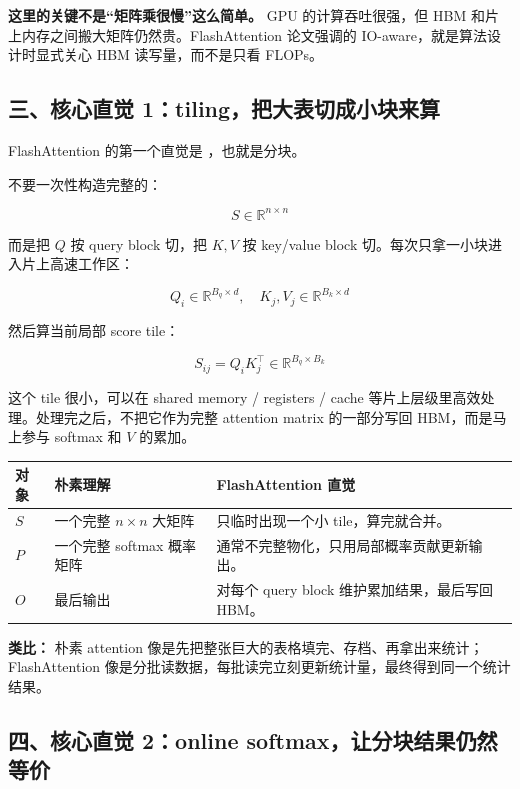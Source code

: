 \begin{warnbox}
\textbf{这里的关键不是“矩阵乘很慢”这么简单。} GPU 的计算吞吐很强，但 HBM 和片上内存之间搬大矩阵仍然贵。FlashAttention 论文强调的 IO-aware，就是算法设计时显式关心 HBM 读写量，而不是只看 FLOPs。
\end{warnbox}

\subsection{三、核心直觉 1：tiling，把大表切成小块来算}

FlashAttention 的第一个直觉是 ，也就是分块。

不要一次性构造完整的：

\[
S\in \mathbb{R}^{n\times n}
\]

而是把 $Q$ 按 query block 切，把 $K,V$ 按 key/value block 切。每次只拿一小块进入片上高速工作区：

\[
Q_i \in \mathbb{R}^{B_q\times d},\quad K_j,V_j \in \mathbb{R}^{B_k\times d}
\]

然后算当前局部 score tile：

\[
S_{ij}=Q_iK_j^\top \in \mathbb{R}^{B_q\times B_k}
\]

这个 tile 很小，可以在 shared memory / registers / cache 等片上层级里高效处理。处理完之后，不把它作为完整 attention matrix 的一部分写回 HBM，而是马上参与 softmax 和 $V$ 的累加。

\begin{center}
{\small
\begin{tabular}{p{3.2cm}p{4.4cm}p{5.3cm}}
\hline
\textbf{对象} & \textbf{朴素理解} & \textbf{FlashAttention 直觉} \\
\hline
$S$ & 一个完整 $n\times n$ 大矩阵 & 只临时出现一个小 tile，算完就合并。 \\
$P$ & 一个完整 softmax 概率矩阵 & 通常不完整物化，只用局部概率贡献更新输出。 \\
$O$ & 最后输出 & 对每个 query block 维护累加结果，最后写回 HBM。 \\
\hline
\end{tabular}
}
\end{center}

\begin{intubox}
\textbf{类比：} 朴素 attention 像是先把整张巨大的表格填完、存档、再拿出来统计；FlashAttention 像是分批读数据，每批读完立刻更新统计量，最终得到同一个统计结果。
\end{intubox}

\subsection{四、核心直觉 2：online softmax，让分块结果仍然等价}

